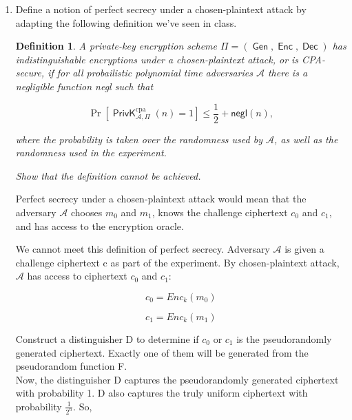 \documentclass{article}
\newtheorem{definition}{Definition}
\DeclareMathOperator{\PrivK}{\textsf{PrivK}}
\DeclareMathOperator{\Gen}{\textsf{Gen}}
\DeclareMathOperator{\Enc}{\textsf{Enc}}
\DeclareMathOperator{\Dec}{\textsf{Dec}}
\begin{document}
\begin{enumerate}
\begin{proof}
      Thus, we find an equivalent definition that $\mathcal{A}$ can only
      distinguish between the two encryption schemes with negligible
      probability.
    \end{proof}
  \item Define a notion of perfect secrecy under a chosen-plaintext attack by
    adapting the following definition we've seen in class.

    \begin{definition}
      \textit{A private-key encryption scheme $\Pi = (\Gen, \Enc,
        \Dec)$ has \textsf{indistinguishable encryptions under a
        chosen-plaintext attack}, or is \textsf{CPA-secure}, if for all
        probailistic polynomial time adversaries $\mathcal{A}$ there is a
      negligible function \textsf{negl} such that}

        \[
          \Pr\left[\PrivK_{\mathcal{A}, \Pi}^\text{cpa}(n) = 1\right] \leq
          \frac{1}{2} + \textsf{negl}(n),
        \]

        \textit{where the probability is taken over the randomness used by
        $\mathcal{A}$, as well as the randomness used in the experiment.}

        \textit{Show that the definition cannot be achieved.}
    \end{definition}

    Perfect secrecy under a chosen-plaintext attack would mean that the 
    adversary $\mathcal{A}$ chooses $m_0$ and $m_1$, knows the challenge ciphertext
    $c_0$ and $c_1$, and has access to the encryption oracle.

    We cannot meet this definition of perfect secrecy. Adversary $\mathcal{A}$ is given a challenge ciphertext c as part of the experiment. By chosen-plaintext attack, $\mathcal{A}$ has access to ciphertext $c_0$ and $c_1$:

    \begin{equation}
        c_0 = Enc_k(m_0)
    \end{equation}

    \begin{equation}
        c_1 = Enc_k(m_1)
    \end{equation}

    Construct a distinguisher D to determine if $c_0$ or $c_1$ is the pseudorandomly generated ciphertext. Exactly one of them will be generated from the pseudorandom function F. \\
    
    Now, the distinguisher D captures the pseudorandomly generated ciphertext with probability 1. D also captures the truly uniform ciphertext with probability $\frac{1}{2^n}$. So,


\end{enumerate}
\end{document}
